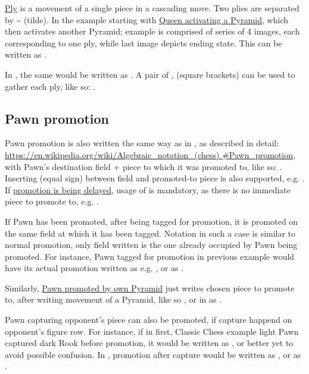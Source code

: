 \hyperref[sec:Terms/Ply]{Ply} is a movement of a single piece in a cascading move. Two plies
are separated by \~{} (tilde). In the example starting with
\hyperref[fig:scn_ma_15_cascading_init]{Queen activating a Pyramid}, which then activates
another Pyramid; example is comprised of series of 4 images, each corresponding to one ply,
while last image depicts ending state. This can be written as .

In , the same would be written as \newline
{}. A pair of \alg{[}, \alg{]} (square brackets) can be used
to gather each ply, like so: \newline
\alg{[Qk2-f7]\~{}[Af7-i7]\~{}[Ai7-i9]}.

\subsection*{Pawn promotion}
\label{sec:Appendix/Notation/Pawn promotion}

Pawn promotion is also written the same way as in , as described in detail: \newline
\href{https://en.wikipedia.org/wiki/Algebraic\_notation\_(chess)\#Pawn\_promotion}{https://en.wikipedia.org/wiki/Algebraic\_notation\_(chess)\newline
\#Pawn\_promotion}, with Pawn's destination field + piece to which it was promoted to,
like so: . Inserting \alg{=} (equal sign) between field and promoted-to piece
is also supported, e.g. .
If \hyperref[fig:scn_aoa_05_delayed_promo_pawn_2_moved]{promotion is being delayed}, usage
of \alg{=} is mandatory, as there is no immediate piece to promote to, e.g. .

If Pawn has been promoted, after being tagged for promotion, it is promoted on the same
field at which it has been tagged. Notation in such a case is similar to normal promotion,
only field written is the one already occupied by Pawn being promoted. For instance, Pawn
tagged for promotion in previous example would have its actual promotion written as e.g.
, or as .

Similarly, \hyperref[fig:scn_ma_05_promo_init]{Pawn promoted by own Pyramid} just writes
chosen piece to promote to, after writing movement of a Pyramid, like so ,
or in  as \alg{[El4-d8]\~{}[Ad8-h8=Q]}.

Pawn capturing opponent's piece can also be promoted, if capture happend on opponent's
figure row. For instance, if in first, Classic Chess example light Pawn captured dark
Rook before promotion, it would be written as , or better yet 
to avoid possible confusion. In , promotion after capture would be written
as , or as .

